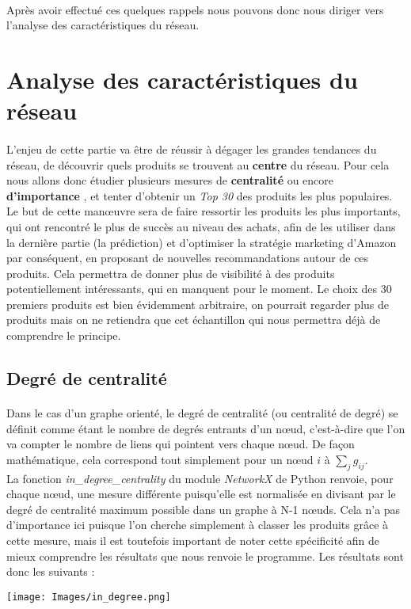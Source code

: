 \documentclass[14pt, openany]{article}
\begin{document}
\paragraph{}
Après avoir effectué ces quelques rappels nous pouvons donc nous diriger vers l'analyse des caractéristiques du réseau.
\section{Analyse des caractéristiques du réseau}
\paragraph{}
L'enjeu de cette partie va être de réussir à dégager les grandes tendances du réseau, de découvrir quels produits se trouvent au \textbf{centre} du réseau. Pour cela nous allons donc étudier plusieurs mesures de \textbf{centralité} ou encore \og \textbf{d'importance} \fg{}, et tenter d'obtenir un \textit{Top 30} des produits les plus populaires. Le but de cette manœuvre sera de faire ressortir les produits les plus importants, qui ont rencontré le plus de succès au niveau des achats, afin de les utiliser dans la dernière partie (la prédiction) et d'optimiser la stratégie marketing d'Amazon par conséquent, en proposant de nouvelles recommandations autour de ces produits. Cela permettra de donner plus de visibilité à des produits potentiellement intéressants, qui en manquent pour le moment. Le choix des 30 premiers produits est bien évidemment arbitraire, on pourrait regarder plus de produits mais on ne retiendra que cet échantillon qui nous permettra déjà de comprendre le principe.

\subsection{Degré de centralité}
\paragraph{}
Dans le cas d'un graphe orienté, le degré de centralité (ou centralité de degré) se définit comme étant le nombre de degrés entrants d'un nœud, c'est-à-dire que l'on va compter le nombre de liens qui pointent vers chaque nœud. De façon mathématique, cela correspond tout simplement pour un nœud $i$ à $\sum\limits_{j}g_{ij}$.\\
La fonction \textit{in\_degree\_centrality} du module \textit{NetworkX} de Python renvoie, pour chaque nœud, une mesure différente puisqu'elle est normalisée en divisant par le degré de centralité maximum possible dans un graphe à N-1 nœuds. Cela n'a pas d'importance ici puisque l'on cherche simplement à classer les produits grâce à cette mesure, mais il est toutefois important de noter cette spécificité afin de mieux comprendre les résultats que nous renvoie le programme. Les résultats sont donc les suivants :\\
\begin{center}
\texttt{[image: Images/in\_degree.png]}
\label{fig1}
\end{center}
\end{document}
